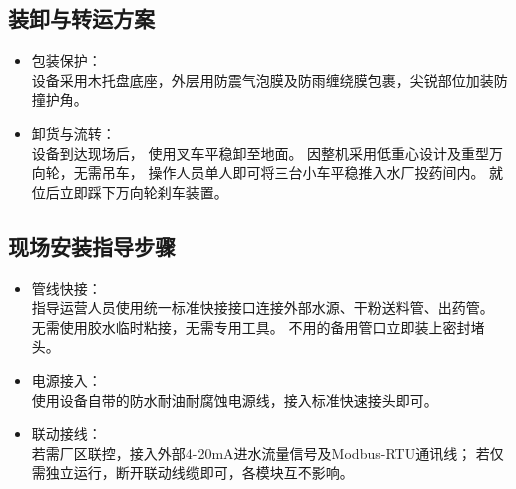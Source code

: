\documentclass[UTF8,a4paper,12pt,titlepage]{ctexart}
\begin{document}
    \subsection{装卸与转运方案}
        \begin{itemize}
            \item 包装保护：\\
            设备采用木托盘底座，外层用防震气泡膜及防雨缠绕膜包裹，尖锐部位加装防撞护角。
            \item 卸货与流转：\\
            设备到达现场后，
            使用叉车平稳卸至地面。
            因整机采用低重心设计及重型万向轮，无需吊车，
            操作人员单人即可将三台小车平稳推入水厂投药间内。
            就位后立即踩下万向轮刹车装置。
        \end{itemize}

    \subsection{现场安装指导步骤}
        \begin{itemize}
            \item 管线快接：\\
            指导运营人员使用统一标准快接接口连接外部水源、干粉送料管、出药管。
            无需使用胶水临时粘接，无需专用工具。
            不用的备用管口立即装上密封堵头。
            \item 电源接入：\\
            使用设备自带的防水耐油耐腐蚀电源线，接入标准快速接头即可。
            \item 联动接线：\\
            若需厂区联控，接入外部4-20mA进水流量信号及Modbus-RTU通讯线；
            若仅需独立运行，断开联动线缆即可，各模块互不影响。
        \end{itemize}
\end{document}
